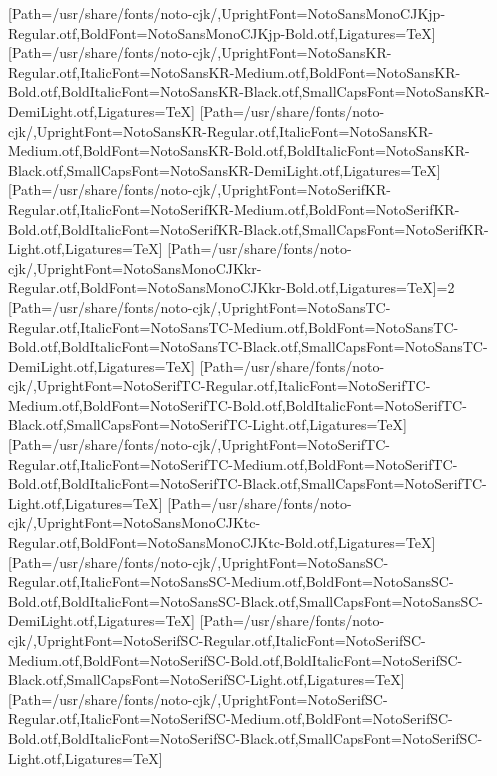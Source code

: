 \newfontfamily{}[Path=/usr/share/fonts/noto-cjk/,UprightFont=NotoSansMonoCJKjp-Regular.otf,BoldFont=NotoSansMonoCJKjp-Bold.otf,Ligatures=TeX]
\newfontfamily{}[Path=/usr/share/fonts/noto-cjk/,UprightFont=NotoSansKR-Regular.otf,ItalicFont=NotoSansKR-Medium.otf,BoldFont=NotoSansKR-Bold.otf,BoldItalicFont=NotoSansKR-Black.otf,SmallCapsFont=NotoSansKR-DemiLight.otf,Ligatures=TeX]
\newfontfamily{}[Path=/usr/share/fonts/noto-cjk/,UprightFont=NotoSansKR-Regular.otf,ItalicFont=NotoSansKR-Medium.otf,BoldFont=NotoSansKR-Bold.otf,BoldItalicFont=NotoSansKR-Black.otf,SmallCapsFont=NotoSansKR-DemiLight.otf,Ligatures=TeX]
\newfontfamily{}[Path=/usr/share/fonts/noto-cjk/,UprightFont=NotoSerifKR-Regular.otf,ItalicFont=NotoSerifKR-Medium.otf,BoldFont=NotoSerifKR-Bold.otf,BoldItalicFont=NotoSerifKR-Black.otf,SmallCapsFont=NotoSerifKR-Light.otf,Ligatures=TeX]
\newfontfamily{}[Path=/usr/share/fonts/noto-cjk/,UprightFont=NotoSansMonoCJKkr-Regular.otf,BoldFont=NotoSansMonoCJKkr-Bold.otf,Ligatures=TeX]\else\ifnum\value{NotoCJKFamily}=2
\newfontfamily{}[Path=/usr/share/fonts/noto-cjk/,UprightFont=NotoSansTC-Regular.otf,ItalicFont=NotoSansTC-Medium.otf,BoldFont=NotoSansTC-Bold.otf,BoldItalicFont=NotoSansTC-Black.otf,SmallCapsFont=NotoSansTC-DemiLight.otf,Ligatures=TeX]
\newfontfamily{}[Path=/usr/share/fonts/noto-cjk/,UprightFont=NotoSerifTC-Regular.otf,ItalicFont=NotoSerifTC-Medium.otf,BoldFont=NotoSerifTC-Bold.otf,BoldItalicFont=NotoSerifTC-Black.otf,SmallCapsFont=NotoSerifTC-Light.otf,Ligatures=TeX]
\newfontfamily{}[Path=/usr/share/fonts/noto-cjk/,UprightFont=NotoSerifTC-Regular.otf,ItalicFont=NotoSerifTC-Medium.otf,BoldFont=NotoSerifTC-Bold.otf,BoldItalicFont=NotoSerifTC-Black.otf,SmallCapsFont=NotoSerifTC-Light.otf,Ligatures=TeX]
\newfontfamily{}[Path=/usr/share/fonts/noto-cjk/,UprightFont=NotoSansMonoCJKtc-Regular.otf,BoldFont=NotoSansMonoCJKtc-Bold.otf,Ligatures=TeX]
\newfontfamily{}[Path=/usr/share/fonts/noto-cjk/,UprightFont=NotoSansSC-Regular.otf,ItalicFont=NotoSansSC-Medium.otf,BoldFont=NotoSansSC-Bold.otf,BoldItalicFont=NotoSansSC-Black.otf,SmallCapsFont=NotoSansSC-DemiLight.otf,Ligatures=TeX]
\newfontfamily{}[Path=/usr/share/fonts/noto-cjk/,UprightFont=NotoSerifSC-Regular.otf,ItalicFont=NotoSerifSC-Medium.otf,BoldFont=NotoSerifSC-Bold.otf,BoldItalicFont=NotoSerifSC-Black.otf,SmallCapsFont=NotoSerifSC-Light.otf,Ligatures=TeX]
\newfontfamily{}[Path=/usr/share/fonts/noto-cjk/,UprightFont=NotoSerifSC-Regular.otf,ItalicFont=NotoSerifSC-Medium.otf,BoldFont=NotoSerifSC-Bold.otf,BoldItalicFont=NotoSerifSC-Black.otf,SmallCapsFont=NotoSerifSC-Light.otf,Ligatures=TeX]
